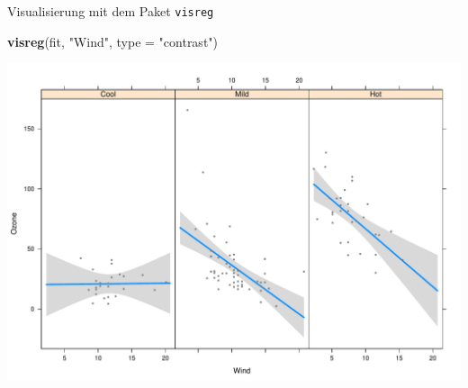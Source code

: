 \documentclass[ignorenonframetext,]{beamer}
\newenvironment{Shaded}{}{}
\newcommand{\KeywordTok}[1]{\textcolor[rgb]{0.00,0.44,0.13}{\textbf{{#1}}}}
\newcommand{\DataTypeTok}[1]{\textcolor[rgb]{0.56,0.13,0.00}{{#1}}}
\newcommand{\StringTok}[1]{\textcolor[rgb]{0.25,0.44,0.63}{{#1}}}
\newcommand{\NormalTok}[1]{{#1}}
\begin{document}
\begin{frame}[fragile]{Visualisierung mit dem Paket \texttt{visreg}}

\begin{Shaded}
\begin{Highlighting}[]
\KeywordTok{visreg}\NormalTok{(fit, }\StringTok{"Wind"}\NormalTok{, }\DataTypeTok{type =} \StringTok{"contrast"}\NormalTok{)}
\end{Highlighting}
\end{Shaded}

\includegraphics{R_intern_files/figure-beamer/unnamed-chunk-311-1.pdf}

\end{frame}
\end{document}
